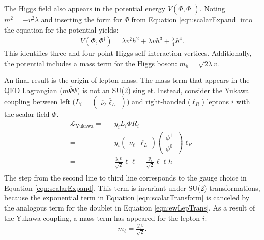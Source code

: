 The Higgs field also appears in the potential energy $V(\Phi,\Phi^\dagger)$.
Noting $m^2=-v^2\lambda$ and inserting the form for $\Phi$ from Equation \ref{eqn:scalarExpand} into the equation for the potential yields:
\begin{equation}\begin{split}
    V(\Phi,\Phi^\dagger)=\lambda v^2h^2+\lambda vh^3+\frac{\lambda}{4}h^4.
\end{split}\end{equation} 
This identifies three and four point Higgs self interaction vertices.
Additionally, the potential includes a mass term for the Higgs boson: $m_h=\sqrt{2\lambda}v$.

An final result is the origin of lepton mass.
The mass term that appears in the QED Lagrangian ($m\overline{\Psi}\Psi$) is not an SU(2) singlet.
Instead, consider the Yukawa coupling between left ($L_i=\begin{pmatrix}\overline{\nu}_\ell\overline{\ell}_L\end{pmatrix}$) and right-handed ($\ell_R$) leptons $i$ with the scalar field $\Phi$.
\begin{equation}\begin{split}
        \mathcal{L}_{\text{Yukawa}}=&-y_i L_i\Phi R_i \\
        =&-y_i\begin{pmatrix}\overline{\nu}_\ell&\overline{\ell}_L\end{pmatrix}\begin{pmatrix}\phi^+\\\phi^0\end{pmatrix}\ell_R \\
        =&-\frac{y_iv}{\sqrt{2}}\overline{\ell}\ell-\frac{y_i}{\sqrt{2}}\overline{\ell}\ell h \\
\end{split}\end{equation} 
The step from the second line to third line corresponds to the gauge choice in Equation \ref{eqn:scalarExpand}.
This term is invariant under SU(2) transformations, because the exponential term in Equation \ref{eqn:scalarTransform} is canceled by the analogous term for the doublet in Equation \ref{eqn:ewLepTrans}.
As a result of the Yukawa coupling, a mass term has appeared for the lepton $i$:
\begin{equation}\begin{split}\label{eqn:yukawaMass}
    m_\ell=\frac{y_iv}{\sqrt{2}}.
\end{split}\end{equation} 
